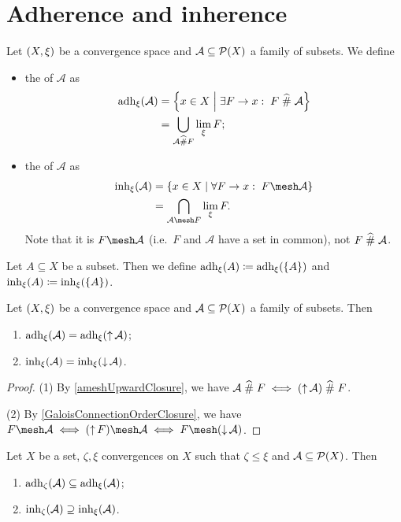 \section{Adherence and inherence}
\begin{definition}
Let $\left( X,\xi \right)$ be a convergence space and $\mathcal{A}\subseteq \operatorname{\mathcal{P}}(X)$ a family of subsets. We define
\begin{itemize}
\item the  of $\mathcal{A}$ as
\begin{align*}
\operatorname{adh}_\xi(\mathcal{A}) &= \left\{ x\in X \;\middle|\; \exists F\to x: \; F\mathrel{\widehat{\#}}\mathcal{A} \right\} \\
&= \bigcup_{\mathcal{A}\mathrel{\widehat{\#}} F}\lim_\xi F;
\end{align*}
\item the  of $\mathcal{A}$ as
\begin{align*}
\inh_\xi(\mathcal{A}) &= \setbuilder{x\in X}{\forall F\to x: \; F\mesh\mathcal{A}} \\
&= \bigcap_{\mathcal{A}\mesh F}\lim_\xi F.
\end{align*}
Note that it is $F\mesh\mathcal{A}$ (i.e.\ $F$ and $\mathcal{A}$ have a set in common), not $F\mathrel{\widehat{\#}}\mathcal{A}$.
\end{itemize}
Let $A\subseteq X$ be a subset. Then we define $\operatorname{adh}_\xi(A) \coloneqq \operatorname{adh}_\xi(\{A\})$ and $\operatorname{inh}_\xi(A) \coloneqq \operatorname{inh}_\xi(\{A\})$.
\end{definition}

\begin{lemma} \label{adherenceInherenceOrderClosure}
Let $\left( X,\xi \right)$ be a convergence space and $\mathcal{A}\subseteq \operatorname{\mathcal{P}}(X)$ a family of subsets. Then
\begin{enumerate}
\item $\operatorname{adh}_\xi(\mathcal{A}) = \operatorname{adh}_\xi(\operatorname{\uparrow}\mathcal{A})$;
\item $\operatorname{inh}_\xi(\mathcal{A}) = \operatorname{inh}_\xi(\operatorname{\downarrow}\mathcal{A})$.
\end{enumerate}
\end{lemma}
\begin{proof}
(1) By \ref{ameshUpwardClosure}, we have $\mathcal{A}\mathrel{\widehat{\#}} F \iff (\operatorname{\uparrow}\mathcal{A})\mathrel{\widehat{\#}} F$.

(2) By \ref{GaloisConnectionOrderClosure}, we have $F\mesh\mathcal{A} \iff (\upset F)\mesh\mathcal{A} \iff F\mesh(\downset \mathcal{A})$.
\end{proof}

\begin{lemma} \label{inherenceAdherenceMonotoneInConvergence}
Let $X$ be a set, $\zeta, \xi$ convergences on $X$ such that $\zeta \leq \xi$ and $\mathcal{A}\subseteq \operatorname{\mathcal{P}}(X)$. Then
\begin{enumerate}
\item $\operatorname{adh}_\zeta(\mathcal{A}) \subseteq \operatorname{adh}_\xi(\mathcal{A})$;
\item $\operatorname{inh}_\zeta(\mathcal{A}) \supseteq \operatorname{inh}_\xi(\mathcal{A})$.
\end{enumerate}
\end{lemma}

